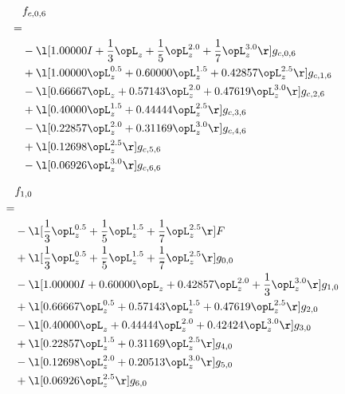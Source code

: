 \begin{alignat}{2} 
\label{eq:f_06_0} 
& f_{c,0,6} \nonumber \\ 
 = \\ 
& - \l[  1.00000 I + \frac{1}{3} \opL_z + \frac{1}{5} \opL_z^{2.0} + \frac{1}{7} \opL_z^{3.0}  \r] g_{c,0,6} \nonumber \\ 
& + \l[  1.00000 \opL_z^{0.5} +  0.60000 \opL_z^{1.5} +  0.42857 \opL_z^{2.5}  \r] g_{c,1,6} \nonumber \\ 
& - \l[  0.66667 \opL_z +  0.57143 \opL_z^{2.0} +  0.47619 \opL_z^{3.0}  \r] g_{c,2,6} \nonumber \\ 
& + \l[  0.40000 \opL_z^{1.5} +  0.44444 \opL_z^{2.5}  \r] g_{c,3,6} \nonumber \\ 
& - \l[  0.22857 \opL_z^{2.0} +  0.31169 \opL_z^{3.0}  \r] g_{c,4,6} \nonumber \\ 
& + \l[  0.12698 \opL_z^{2.5}  \r] g_{c,5,6} \nonumber \\ 
& - \l[  0.06926 \opL_z^{3.0}  \r] g_{c,6,6} \nonumber \\ 
\end{alignat} 


\begin{alignat}{2} 
\label{eq:f_10_0} 
& f_{1,0} \nonumber \\ 
 = \\ 
& - \l[ \frac{1}{3} \opL_z^{0.5} + \frac{1}{5} \opL_z^{1.5} + \frac{1}{7} \opL_z^{2.5}  \r] F \nonumber \\ 
& + \l[ \frac{1}{3} \opL_z^{0.5} + \frac{1}{5} \opL_z^{1.5} + \frac{1}{7} \opL_z^{2.5}  \r] g_{0,0} \nonumber \\ 
& - \l[  1.00000 I +  0.60000 \opL_z +  0.42857 \opL_z^{2.0} + \frac{1}{3} \opL_z^{3.0}  \r] g_{1,0} \nonumber \\ 
& + \l[  0.66667 \opL_z^{0.5} +  0.57143 \opL_z^{1.5} +  0.47619 \opL_z^{2.5}  \r] g_{2,0} \nonumber \\ 
& - \l[  0.40000 \opL_z +  0.44444 \opL_z^{2.0} +  0.42424 \opL_z^{3.0}  \r] g_{3,0} \nonumber \\ 
& + \l[  0.22857 \opL_z^{1.5} +  0.31169 \opL_z^{2.5}  \r] g_{4,0} \nonumber \\ 
& - \l[  0.12698 \opL_z^{2.0} +  0.20513 \opL_z^{3.0}  \r] g_{5,0} \nonumber \\ 
& + \l[  0.06926 \opL_z^{2.5}  \r] g_{6,0} \nonumber \\ 
\end{alignat} 


